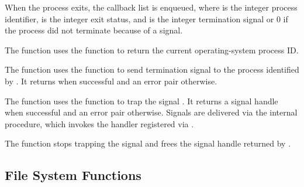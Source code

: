 When the process exits, the callback list  is enqueued, where
 is the integer process identifier,  is the
integer exit status, and  is the integer termination
signal or 0 if the process did not terminate because of a signal.

\begin{function}
\end{function}

The  function uses the 
function to return the current operating-system process ID.

\begin{function}
\end{function}

The  function uses the  function to
send termination signal  to the process identified by
. It returns  when successful and an error pair
otherwise.

\begin{function}
\end{function}

The  function uses the 
function to trap the signal .
It returns a signal handle when successful and an error pair
otherwise.
Signals are delivered via the internal  procedure, which
invokes the handler registered via .

\begin{function}
\end{function}

The  function stops trapping the signal
and frees the signal handle returned by .

\subsection {File System Functions}

\begin{function}
\end{function}

